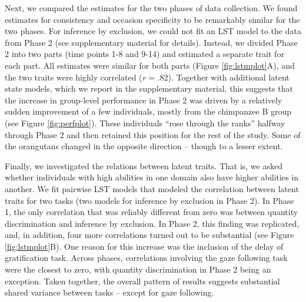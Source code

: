 \documentclass[
  man,floatsintext]{apa6}
\begin{document}
Next, we compared the estimates for the two phases of data collection. We found estimates for consistency and occasion specificity to be remarkably similar for the two phases. For inference by exclusion, we could not fit an LST model to the data from Phase 2 (see supplementary material for details). Instead, we divided Phase 2 into two parts (time points 1-8 and 9-14) and estimated a separate trait for each part. All estimates were similar for both parts (Figure \ref{fig:lstmplot}A), and the two traits were highly correlated (\emph{r} = .82). Together with additional latent state models, which we report in the supplementary material, this suggests that the increase in group-level performance in Phase 2 was driven by a relatively sudden improvement of a few individuals, mostly from the chimpanzee B group (see Figure \ref{fig:perfplot}). These individuals ``rose through the ranks'' halfway through Phase 2 and then retained this position for the rest of the study. Some of the orangutans changed in the opposite direction -- though to a lesser extent.

Finally, we investigated the relations between latent traits. That is, we asked whether individuals with high abilities in one domain also have higher abilities in another. We fit pairwise LST models that modeled the correlation between latent traits for two tasks (two models for inference by exclusion in Phase 2). In Phase 1, the only correlation that was reliably different from zero was between quantity discrimination and inference by exclusion. In Phase 2, this finding was replicated, and, in addition, four more correlations turned out to be substantial (see Figure \ref{fig:lstmplot}B). One reason for this increase was the inclusion of the delay of gratification task. Across phases, correlations involving the gaze following task were the closest to zero, with quantity discrimination in Phase 2 being an exception. Taken together, the overall pattern of results suggests substantial shared variance between tasks -- except for gaze following.
\end{document}
